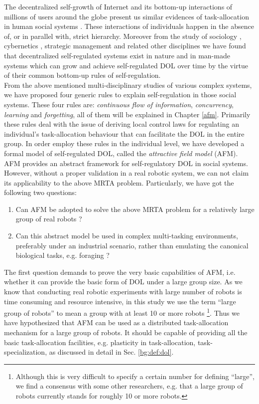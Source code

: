 The decentralized self-growth of Internet and its bottom-up interactions of millions of users around the globe present us similar evidences of task-allocation in human social systems \cite{Andriani+2004}. These interactions of individuals happen in the absence of, or in parallel with, strict hierarchy. Moreover from the study of sociology , cybernetics  , strategic management   and related other disciplines we have found that decentralized self-regulated systems exist in nature and in man-made systems which can grow and achieve self-regulated DOL over time by the virtue of their common bottom-up rules of self-regulation.\\
From the above mentioned multi-disciplinary studies of various complex systems, we have proposed four generic rules to explain self-regulation in those social systems. These four rules are: \textit{continuous flow of information}, \textit{concurrency}, \textit{learning} and \textit{forgetting}, all of them will be explained in Chapter \ref{afm}. Primarily these rules  deal with the issue of deriving local control laws for regulating an individual's task-allocation behaviour that can facilitate the DOL in the entire group. In order employ these rules in the individual level, we have developed a formal model of self-regulated DOL, called the \textit{attractive field model} (AFM).\\
AFM provides an abstract framework for self-regulatory DOL in social systems. However, without a proper validation in a real robotic system, we can not claim its applicability to the above MRTA problem. Particularly, we have got the following two questions:
\begin{enumerate}
\item Can AFM  be adopted to solve the above MRTA problem for a relatively large group of real robots ?
\item Can this abstract model be used  in complex multi-tasking environments, preferably under an industrial scenario, rather than emulating the canonical biological tasks, e.g. foraging ?
\end{enumerate}
The first question demands to prove the very basic capabilities of AFM, i.e. whether it can provide the basic form of DOL under a large group size. As we know that conducting real robotic experiments with large number of robots is time consuming and resource intensive, in this study we use the term ``large group of robots'' to mean a group with at least 10 or more robots \footnote{Although this is very difficult to specify a certain number for defining ``large'', we find a consensus with some other researchers, e.g. \protect{} that a large group of robots currently  stands for roughly 10 or more robots.}. Thus we have hypothesized that AFM can be used as a distributed task-allocation mechanism for a large group of robots. It should be capable of providing all the basic task-allocation facilities, e.g. plasticity in task-allocation, task-specialization, as discussed in detail in Sec. \ref{bg:def:dol}.\\
